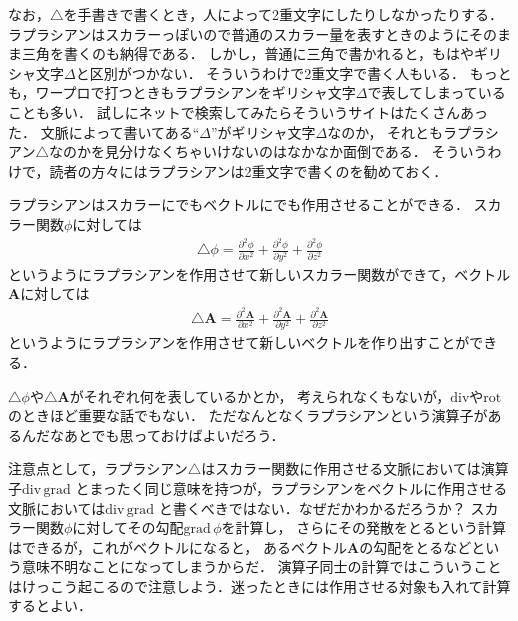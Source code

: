 なお，$\bigtriangleup$を手書きで書くとき，人によって2重文字にしたりしなかったりする．
ラプラシアンはスカラーっぽいので普通のスカラー量を表すときのようにそのまま三角を書くのも納得である．
しかし，普通に三角で書かれると，もはやギリシャ文字$\Delta$と区別がつかない．
そういうわけで2重文字で書く人もいる．
もっとも，ワープロで打つときもラプラシアンをギリシャ文字$\Delta$で表してしまっていることも多い．
試しにネットで検索してみたらそういうサイトはたくさんあった．
文脈によって書いてある``$\Delta$''がギリシャ文字$\Delta$なのか，
それともラプラシアン$\bigtriangleup$なのかを見分けなくちゃいけないのはなかなか面倒である．
そういうわけで，読者の方々にはラプラシアンは2重文字で書くのを勧めておく．

ラプラシアンはスカラーにでもベクトルにでも作用させることができる．
スカラー関数$\phi$に対しては
\begin{align}
\bigtriangleup \phi = \frac{\partial^2\phi}{\partial x^2} + 
\frac{\partial^2 \phi}{\partial y^2} + \frac{\partial^2 \phi}{\partial z^2}
\label{eqsclap}
\end{align}
というようにラプラシアンを作用させて新しいスカラー関数ができて，ベクトル$\bm{A}$に対しては
\begin{align}
\bigtriangleup \bm{A} = \frac{\partial^2 \bm{A} }{\partial x^2} + 
\frac{\partial^2 \bm{A} }{\partial y^2} + \frac{\partial^2 \bm{A} }{\partial z^2}
\label{eq:veclap}
\end{align}
というようにラプラシアンを作用させて新しいベクトルを作り出すことができる．

$\bigtriangleup \phi$や$\bigtriangleup \bm{A} $がそれぞれ何を表しているかとか，
考えられなくもないが，$\mathrm{div}$や$\mathrm{rot}$のときほど重要な話でもない．
ただなんとなくラプラシアンという演算子があるんだなあとでも思っておけばよいだろう．

注意点として，ラプラシアン$\bigtriangleup$はスカラー関数に作用させる文脈においては演算子$\mathrm{div \, grad}$
とまったく同じ意味を持つが，ラプラシアンをベクトルに作用させる文脈においては$\mathrm{div \, grad}$
と書くべきではない．なぜだかわかるだろうか？ スカラー関数$\phi$に対してその勾配$\mathrm{grad} \, \phi$を計算し，
さらにその発散をとるという計算はできるが，これがベクトルになると，
あるベクトル$\bm{A}$の勾配をとるなどという意味不明なことになってしまうからだ．
演算子同士の計算ではこういうことはけっこう起こるので注意しよう．迷ったときには作用させる対象も入れて計算するとよい．

